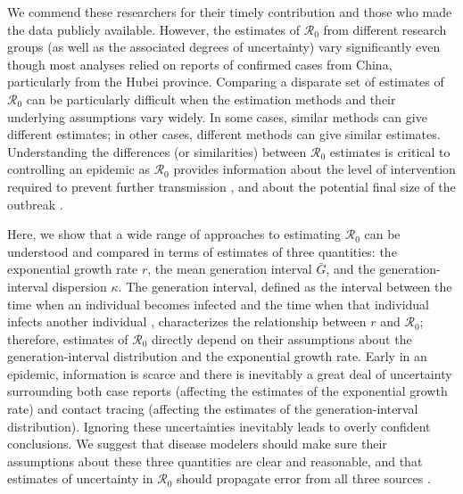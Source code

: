 \documentclass[12pt]{article}
\newcommand{\Ro}{\ensuremath{{\mathcal R}_{0}}\xspace}
\begin{document}
We commend these researchers for their timely contribution and those who made the data publicly available.
However, the estimates of \Ro from different research groups (as well as the associated degrees of uncertainty) vary significantly even though most analyses relied on reports of confirmed cases from China, particularly from the Hubei province.
Comparing a disparate set of estimates of \Ro can be particularly difficult when the estimation methods and their underlying assumptions vary widely.
In some cases, similar methods can give different estimates; in other cases, different methods can give similar estimates.
Understanding the differences (or similarities) between \Ro estimates is critical to controlling an epidemic as \Ro provides information about the level of intervention required to prevent further transmission \citep{anderson1991infectious}, and about the potential final size of the outbreak \citep{anderson1991infectious, ma2006generality}.

Here, we show that a wide range of approaches to estimating \Ro can be understood and compared in terms of estimates of three quantities: the exponential growth rate $r$, the mean generation interval $\bar G$, and the generation-interval dispersion $\kappa$.
The generation interval, defined as the interval between the time when an individual becomes infected and the time when that individual infects another individual \citep{svensson2007note}, characterizes the relationship between $r$ and \Ro \citep{wearing2005appropriate, roberts2007model, wallinga2007generation, park2019practical};
therefore, estimates of \Ro directly depend on their assumptions about the generation-interval distribution and the exponential growth rate.
Early in an epidemic, information is scarce and there is inevitably a great deal of uncertainty surrounding both case reports (affecting the estimates of the exponential growth rate) and contact tracing (affecting the estimates of the generation-interval distribution).
Ignoring these uncertainties inevitably leads to overly confident conclusions.
We suggest that disease modelers should make sure their assumptions about these three quantities are clear and reasonable, and that estimates of uncertainty in \Ro should propagate error from all three sources \citep{elderd2006uncertainty}.
\end{document}
